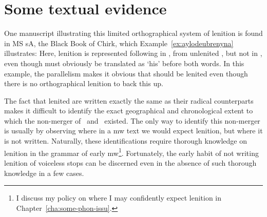 \section{Some textual evidence}
\label{sec:two-exampl-mowm}
One manuscript illustrating this limited orthographical system of lenition is found in MS \gls{sA}, the Black Book of Chirk, which Example~\ref{ex:aylodeubrenyna} illustrates: 
Here, lenition is represented following   in , from unlenited , but not in , even though  must obviously be translated as `his' before both words. In this example, the parallelism makes it obvious that  should be lenited even though there is no orthographical lenition to back this up.

The fact that lenited  are written exactly the same as their radical counterparts makes it difficult to identify the exact geographical and chronological extent to which the non-merger of \xD\ and \lT\ existed. The only way to identify this non-merger is usually by observing where in a \gls{mw} text we would expect lenition, but where it is not written. Naturally, these identifications require thorough knowledge on lenition in  the grammar of early \gls{mw}\footnote{I discuss my policy on where I may confidently expect lenition in Chapter~\ref{cha:some-phon-issu}.}. Fortunately, the early habit of not writing lenition of voiceless stops can be discerned even in the absence of such thorough knowledge in a few cases.


